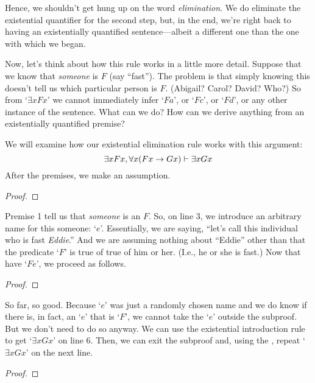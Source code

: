 \noindent Hence, we shouldn't get hung up on the word \textit{elimination}. We do eliminate the existential quantifier for the second step, but, in the end, we're right back to having an existentially quantified sentence---albeit a different one than the one with which we began.

Now, let's think about how this rule works in a little more detail. Suppose that we know that \emph{someone} is $F$ (say ``fast''). The problem is that simply knowing this doesn't tell us which particular person is $F$. (Abigail? Carol? David? Who?) So from `$\exists x Fx$' we cannot immediately infer `$Fa$', or `$Fc$', or `$Fd$',  or any other instance of the sentence. What can we do?  How can we derive anything from an existentially quantified premise?

We will examine how our existential elimination rule works with this argument:
$$\exists x Fx, \forall x(Fx \rightarrow Gx) \vdash \exists x Gx$$
After the premises, we make an assumption.
\begin{proof}
	 \pr{}
	 \pr{}
	\open
		 \as{}
\end{proof}
Premise 1 tell us that \emph{someone} is an $F$.  So, on line 3, we introduce an arbitrary name for this someone: `$e$'. Essentially, we are saying, ``let's call this individual who is fast \textit{Eddie}.'' And we are assuming nothing about ``Eddie'' other than that the predicate `$F$' is true of true of him or her. (I.e., he or she is fast.) Now that have `$Fe$', we proceed as follows. 
\begin{proof}
	 \pr{}
	 \pr{}
	\open
		 \as{}
		 
\end{proof}
So far, so good. Because `$e$' was just a randomly chosen name and we do know if there is, in fact, an `$e$' that is `$F$', we cannot take the `$e$' outside the subproof. But we don't need to do so anyway. We can use the existential introduction rule to get `$\exists xGx$' on line 6. Then, we can exit the subproof and, using the , repeat `$\exists xGx$' on the next line.
\begin{proof}
	 \pr{}
	 \pr{}
	\open
		 \as{}
		 
	\close
\end{proof}

